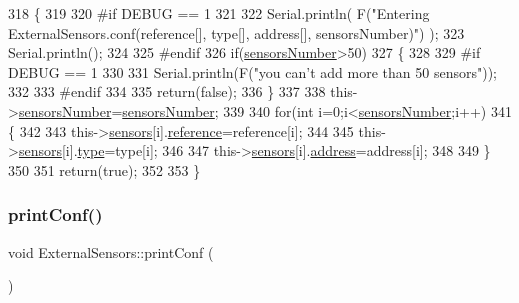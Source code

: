 \begin{DoxyCode}
318 \{
319 
320 \textcolor{preprocessor}{#if DEBUG == 1}
321 
322     Serial.println( F(\textcolor{stringliteral}{"Entering ExternalSensors.conf(reference[], type[], address[], sensorsNumber)"}) );
323     Serial.println();
324 
325 \textcolor{preprocessor}{#endif  }
326     \textcolor{keywordflow}{if}(\hyperlink{class_external_sensors_a58e4fbf9adeae787d92be5fa33043b5d}{sensorsNumber}>50)
327     \{
328     
329 \textcolor{preprocessor}{    #if DEBUG == 1}
330     
331         Serial.println(F(\textcolor{stringliteral}{"you can't add more than 50 sensors"}));    
332     
333 \textcolor{preprocessor}{    #endif  }
334     
335         \textcolor{keywordflow}{return}(\textcolor{keyword}{false});
336     \}
337 
338     this->\hyperlink{class_external_sensors_a58e4fbf9adeae787d92be5fa33043b5d}{sensorsNumber}=\hyperlink{class_external_sensors_a58e4fbf9adeae787d92be5fa33043b5d}{sensorsNumber};
339     
340     \textcolor{keywordflow}{for}(\textcolor{keywordtype}{int} i=0;i<\hyperlink{class_external_sensors_a58e4fbf9adeae787d92be5fa33043b5d}{sensorsNumber};i++)
341     \{
342     
343         this->\hyperlink{class_external_sensors_a284233f884fcf00154a44740cf1d9e1e}{sensors}[i].\hyperlink{struct_external_sensors_1_1sensor_afed5bdfd49732202a368b600cb8396fe}{reference}=reference[i];
344         
345         this->\hyperlink{class_external_sensors_a284233f884fcf00154a44740cf1d9e1e}{sensors}[i].\hyperlink{struct_external_sensors_1_1sensor_a6acfdb02c742c2110d7bd2b5d9fce9e7}{type}=type[i];
346 
347         this->\hyperlink{class_external_sensors_a284233f884fcf00154a44740cf1d9e1e}{sensors}[i].\hyperlink{struct_external_sensors_1_1sensor_a8d70ca58524521ed054fc6b81eb58d34}{address}=address[i];
348     
349     \}
350     
351     \textcolor{keywordflow}{return}(\textcolor{keyword}{true});
352 
353 \}
\end{DoxyCode}
\mbox{\label{class_external_sensors_a78c2bf55084435dd51d3c559b2d3c6f3}} 
\subsubsection{\texorpdfstring{print\+Conf()}{printConf()}}
{\footnotesize\ttfamily void External\+Sensors\+::print\+Conf (\begin{DoxyParamCaption}{ }\end{DoxyParamCaption})}

